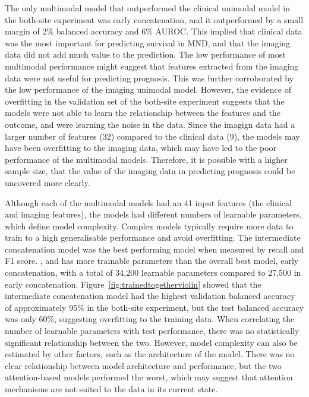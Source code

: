 The only multimodal model that outperformed the clinical unimodal model in the both-site experiment was early concatenation, and it outperformed by a small margin of 2\% balanced accuracy and 6\% AUROC.
This implied that clinical data was the most important for predicting survival in MND, and that the imaging data did not add much value to the prediction.
The low performance of most multimodal performance might suggest that features extracted from the imaging data were not useful for predicting prognosis.
This was further corroborated by the low performance of the imaging unimodal model.
However, the evidence of overfitting in the validation set of the both-site experiment suggests that the models were not able to learn the relationship between the features and the outcome, and were learning the noise in the data.
Since the imagign data had a larger number of features (32) compared to the clinical data (9), the models may have been overfitting to the imaging data, which may have led to the poor performance of the multimodal models.
Therefore, it is possible with a higher sample size, that the value of the imaging data in predicting prognosis could be uncovered more clearly.

Although each of the multimodal models had an 41 input features (the clinical and imaging features), the models had different numbers of learnable parameters, which define model complexity.
Complex models typically require more data to train to a high generalisable performance and avoid overfitting.
The intermediate concatenation model was the best performing model when measured by recall and F1 score.
, and has more trainable parameters than the overall best model, early concatenation, with a total of 34,200 learnable parameters compared to 27,500 in early concatenation.
Figure~\ref{fig:trainedtogetherviolin} showed that the intermediate concatenation model had the highest validation balanced accuracy of approximately 95\% in the both-site experiment, but the test balanced accuracy was only 60\%, suggesting overfitting to the training data.
When correlating the number of learnable parameters with test performance, there was no statistically significant relationship between the two.
However, model complexity can also be estimated by other factors, such as the architecture of the model.
There was no clear relationship between model architecture and performance, but the two attention-based models performed the worst, which may suggest that attention mechanisms are not suited to the data in its current state.

